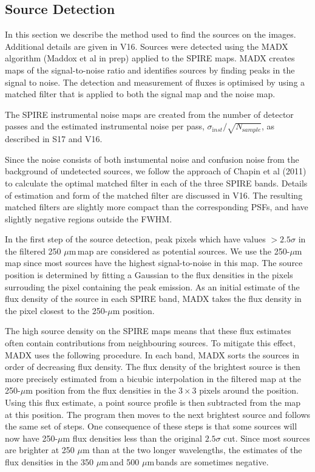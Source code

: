 \documentclass[useAMS,usenatbib]{mnras}
\def\mic{ $\mu $m\,}
\begin{document}
\subsection{Source Detection} 


In this section we describe the method used to find the
sources on the images. Additional details are given in V16.
Sources were detected using the MADX algorithm (Maddox et al in prep)
applied to the SPIRE maps.  MADX creates maps of the signal-to-noise
ratio and identifies sources by finding peaks in the signal to noise. The
detection and measurement of fluxes is optimised by using a matched
filter that is applied to both the signal map and the noise map. 

The SPIRE instrumental noise maps are created from the number of
detector passes and the estimated instrumental noise per pass,
$\sigma_{\mathrm inst} /\sqrt{N_ {\mathrm sample}}$, as described in S17 and V16.

 
Since the noise consists of both instumental noise and
confusion noise from the background of undetected sources, we follow
the approach of Chapin et al (2011) to calculate the optimal matched
filter in each of the three SPIRE bands. Details of estimation and
form of the matched filter are discussed in V16.  The resulting
matched filters are slightly more compact than the corresponding PSFs,
and have slightly negative regions outside the FWHM.  

In the first step of the source detection, peak pixels which have
values $>2.5\sigma$ in the filtered 250\mic map are considered as
potential sources. 
We use the 250-$\mu$m map since most sources
have the highest signal-to-noise in this map.
The source 
position is determined by
fitting a Gaussian to the flux densities in the pixels surrouding
the pixel containing the peak emission.
As an initial estimate of the flux density of the
source in each SPIRE band, MADX takes the flux density in the
pixel closest to the 250-$\mu$m position.

The high source density on the SPIRE maps means that these flux estimates
often contain contributions from neighbouring sources.
To mitigate this effect, MADX uses the following procedure.
In each band, MADX sorts the sources in order of decreasing flux
density.
The
flux density of the brightest source is then
more precisely estimated from a bicubic interpolation
in the filtered map at the
250-$\mu$m position from the flux densities in the
$3 \times 3$ pixels around the position. 
Using this flux estimate, a point source profile is then subtracted
from the map at this position. The program then moves to the
next brightest source and follows the same set of steps.
One consequence of these steps
is that some sources will now have 250-$\mu$m flux densities
less than the
original $2.5\sigma$ cut. 
Since most sources are brighter at 250 $\mu$m than at the two
longer wavelengths, the estimates of the flux densities in the
350\mic and 500\mic bands are sometimes negative.
\end{document}
